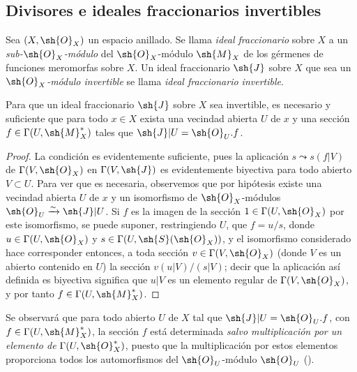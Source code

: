 \subsection{Divisores e ideales fraccionarios invertibles}
\label{subsection:IV.21.2}

\begin{env}[21.2.1]
\label{IV.21.2.1}
Sea $(X,\sh{O}_X)$ un espacio anillado.
Se llama \emph{ideal fraccionario} sobre $X$ a un \emph{sub-$\sh{O}_X$-módulo} del $\sh{O}_X$-módulo $\sh{M}_X$ de los gérmenes de funciones meromorfas sobre $X$.
Un ideal fraccionario $\sh{J}$ sobre $X$ que sea un \emph{$\sh{O}_X$-módulo invertible} se llama \emph{ideal fraccionario invertible}.
\end{env}

\begin{proposition}[21.2.2]
\label{IV.21.2.2}
Para que un ideal fraccionario $\sh{J}$ sobre $X$ sea invertible, es necesario y suficiente que para todo $x\in X$ exista una vecindad abierta $U$ de $x$ y una sección $f\in\Gamma(U,\sh{M}_X^*)$ tales que $\sh{J}|U=\sh{O}_U.f$.
\end{proposition}

\begin{proof}
La condición es evidentemente suficiente, pues la aplicación $s\leadsto s(f|V)$ de $\Gamma(V,\sh{O}_X)$ en $\Gamma(V,\sh{J})$ es evidentemente biyectiva para todo abierto $V\subset U$.
Para ver que es necesaria, observemos que por hipótesis existe una vecindad abierta $U$ de $x$ y un isomorfismo de $\sh{O}_X$-módulos $\sh{O}_U\xrightarrow{\sim}\sh{J}|U$.
Si $f$ es la imagen de la sección $1\in\Gamma(U,\sh{O}_X)$ por este isomorfismo, se puede suponer, restringiendo $U$, que $f=u/s$, donde $u\in\Gamma(U,\sh{O}_X)$ y $s\in\Gamma(U,\sh{S}(\sh{O}_X))$, y el isomorfismo considerado hace corresponder entonces, a toda sección $v\in\Gamma(V,\sh{O}_X)$ (donde $V$ es un abierto contenido en $U$) la sección $v(u|V)/(s|V)$;
decir que la aplicación así definida es biyectiva significa que $u|V$ es un elemento regular de $\Gamma(V,\sh{O}_X)$, y por tanto $f\in\Gamma(U,\sh{M}_X^*)$.
\end{proof}

Se observará que para todo abierto $U$ de $X$ tal que $\sh{J}|U=\sh{O}_U.f$, con $f\in\Gamma(U,\sh{M}_X^*)$, la sección $f$ está determinada \emph{salvo multiplicación por un elemento de} $\Gamma(U,\sh{O}_X^*)$, puesto que la
multiplicación por estos elementos proporciona todos los automorfismos del $\sh{O}_U$-módulo $\sh{O}_U$ ().

